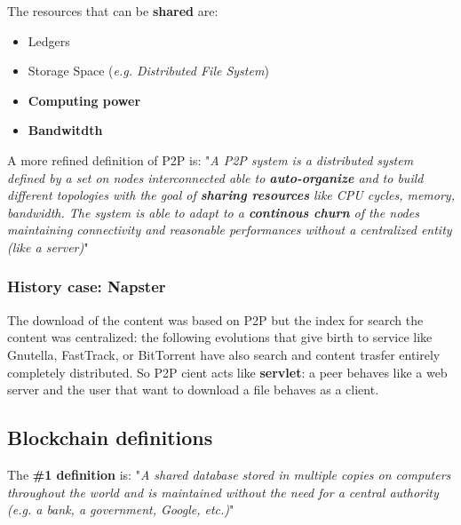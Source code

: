 \documentclass[10pt,a4paper]{report}
\begin{document}
The resources that can be \textbf{shared} are:
\begin{itemize}
	\item 
	Ledgers
	\item 
	Storage Space (\textit{e.g. Distributed File System})
	\item 
	\textbf{Computing power}
	\item 
	\textbf{Bandwitdth}
\end{itemize}

A more refined definition of P2P is:
"\textit{A P2P system is a distributed system defined by a set on nodes interconnected able to \textbf{auto-organize} and to build different topologies with the goal of \textbf{sharing resources} like CPU cycles, memory, bandwidth. The system is able to adapt to a \textbf{continous churn} of the nodes maintaining connectivity and reasonable performances without a centralized entity (like a server)}"
\subsubsection{History case: Napster}
\label{sec:history-case-napster}
The download of the content was based on P2P but the index for search the content was centralized: the following evolutions that give birth to service like Gnutella, FastTrack, or BitTorrent have also search and content trasfer entirely completely distributed.
So P2P cient acts like \textbf{servlet}: a peer behaves like a web server and the user that want to download a file behaves as a client.
\subsection{Blockchain definitions}
\label{sec:blockchain-definitions}
The \textbf{\#1 definition} is:
"\textit{A shared database stored in multiple copies on computers throughout the world and is maintained without the need for a central authority (e.g. a bank, a government, Google, etc.)}"
\end{document}
